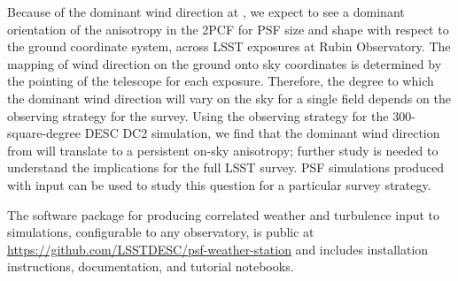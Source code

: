 \documentclass[twocolumn,twocolappendix]{openjournal}
\begin{document}
Because of the dominant wind direction at \cp, we expect to see a dominant orientation of the anisotropy in the 2PCF for PSF size and shape with respect to the ground coordinate system, across LSST exposures at Rubin Observatory.  
The mapping of wind direction on the ground onto sky coordinates is determined by the pointing of the telescope for each exposure. 
Therefore, the degree to which the dominant wind direction will vary on the sky for a single field depends on the observing strategy for the survey. 
Using the observing strategy for the 300-square-degree DESC DC2 simulation, we find that the dominant wind direction from  will translate to a persistent on-sky anisotropy; further study is needed to understand the implications for the full LSST survey. 
PSF simulations produced with \psfws input can be used to study this question for a particular survey strategy. 

The \psfws software package for producing correlated weather and turbulence input to simulations, configurable to any observatory, is public at \url{https://github.com/LSSTDESC/psf-weather-station} and includes installation instructions, documentation, and tutorial notebooks.
\end{document}
